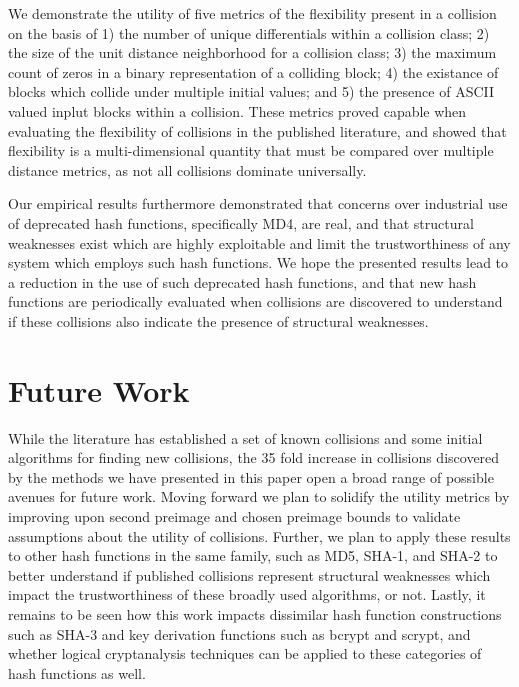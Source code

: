 \documentclass[conference]{IEEEtran}
\begin{document}
We demonstrate the utility of five metrics of the flexibility present
in a collision on the basis of 1) the number of unique differentials
within a collision class; 2) the size of the unit distance
neighborhood for a collision class; 3) the maximum count of zeros in a
binary representation of a colliding block; 4) the existance of blocks
which collide under multiple initial values; and 5) the presence of
ASCII valued inplut blocks within a collision.  These metrics proved
capable when evaluating the flexibility of collisions in the published
literature, and showed that flexibility is a multi-dimensional
quantity that must be compared over multiple distance metrics, as not all
collisions dominate universally.

Our empirical results furthermore demonstrated that concerns over
industrial use of deprecated hash functions, specifically MD4, are
real, and that structural weaknesses exist which are highly
exploitable and limit the trustworthiness of any system which employs
such hash functions.  We hope the presented results lead to a
reduction in the use of such deprecated hash functions, and that new
hash functions are periodically evaluated when collisions are
discovered to understand if these collisions also indicate the
presence of structural weaknesses.

\section{Future Work} \label{Sec:Future}

While the literature has established a set of known collisions and
some initial algorithms for finding new collisions, the 35 fold
increase in collisions discovered by the methods we have presented in
this paper open a broad range of possible avenues for future work.
Moving forward we plan to solidify the utility metrics by improving upon
second preimage and chosen preimage bounds to validate assumptions about the
utility of collisions. Further, we plan to apply these results to other hash
functions in the same family, such as MD5, SHA-1, and SHA-2 to better
understand if published collisions represent structural weaknesses
which impact the trustworthiness of these broadly used algorithms, or not. Lastly, it
remains to be seen how this work impacts dissimilar hash function constructions such as
SHA-3 and key derivation functions such as bcrypt and scrypt, and whether
logical cryptanalysis techniques can be applied to these categories of
hash functions as well.
\end{document}
